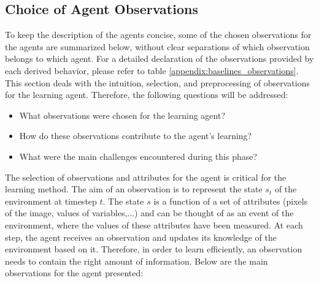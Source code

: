 






\subsection{Choice of Agent Observations}\label{chap:3:agent-choice-actions}
To keep the description of the agents concise, some of the chosen observations for the agents are summarized below, without clear separations of which observation belongs to which agent. For a detailed declaration of the observations provided by each derived behavior, please refer to table \ref{appendix:baselines_observations}. This section deals with the intuition, selection, and preprocessing of observations for the learning agent. Therefore, the following questions will be addressed:
\begin{itemize}
    \item What observations were chosen for the learning agent?
    \item How do these observations contribute to the agent's learning?
    \item What were the main challenges encountered during this phase?
\end{itemize}

The selection of observations and attributes for the agent is critical for the learning method. The aim of an observation is to  represent the state $s_t$ of the environment at timestep $t$. The state $s$ is a function of a set of attributes (pixels of the image, values of variables,...) and  can be thought of as an event of the environment, where the values of these attributes have been measured.
At each step, the agent receives an observation and updates its knowledge of the environment based on it. 
Therefore, in order to learn efficiently, an observation needs to contain the right amount of information. Below are the main observations for the agent presented:

